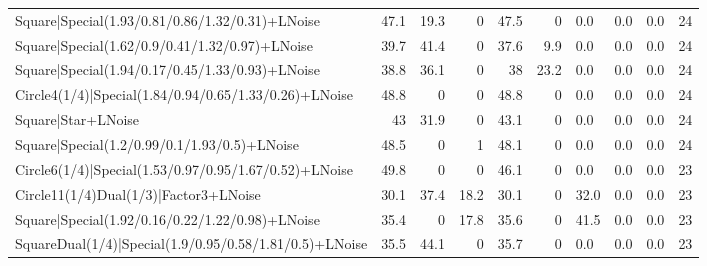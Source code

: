\begin{tabular}{lrrrrrlllr}
 Square|Special(1.93/0.81/0.86/1.32/0.31)+LNoise                 &            47.1 &            19.3 &             0   &            47.5 &            0   & 0.0             & 0.0            & 0.0            &           24 \\
 Square|Special(1.62/0.9/0.41/1.32/0.97)+LNoise                  &            39.7 &            41.4 &             0   &            37.6 &            9.9 & 0.0             & 0.0            & 0.0            &           24 \\
 Square|Special(1.94/0.17/0.45/1.33/0.93)+LNoise                 &            38.8 &            36.1 &             0   &            38   &           23.2 & 0.0             & 0.0            & 0.0            &           24 \\
 Circle4(1/4)|Special(1.84/0.94/0.65/1.33/0.26)+LNoise           &            48.8 &             0   &             0   &            48.8 &            0   & 0.0             & 0.0            & 0.0            &           24 \\
 Square|Star+LNoise                                              &            43   &            31.9 &             0   &            43.1 &            0   & 0.0             & 0.0            & 0.0            &           24 \\
 Square|Special(1.2/0.99/0.1/1.93/0.5)+LNoise                    &            48.5 &             0   &             1   &            48.1 &            0   & 0.0             & 0.0            & 0.0            &           24 \\
 Circle6(1/4)|Special(1.53/0.97/0.95/1.67/0.52)+LNoise           &            49.8 &             0   &             0   &            46.1 &            0   & 0.0             & 0.0            & 0.0            &           23 \\
 Circle11(1/4)Dual(1/3)|Factor3+LNoise                           &            30.1 &            37.4 &            18.2 &            30.1 &            0   & 32.0            & 0.0            & 0.0            &           23 \\
 Square|Special(1.92/0.16/0.22/1.22/0.98)+LNoise                 &            35.4 &             0   &            17.8 &            35.6 &            0   & 41.5            & 0.0            & 0.0            &           23 \\
 SquareDual(1/4)|Special(1.9/0.95/0.58/1.81/0.5)+LNoise          &            35.5 &            44.1 &             0   &            35.7 &            0   & 0.0             & 0.0            & 0.0            &           23 \\

\end{tabular}
